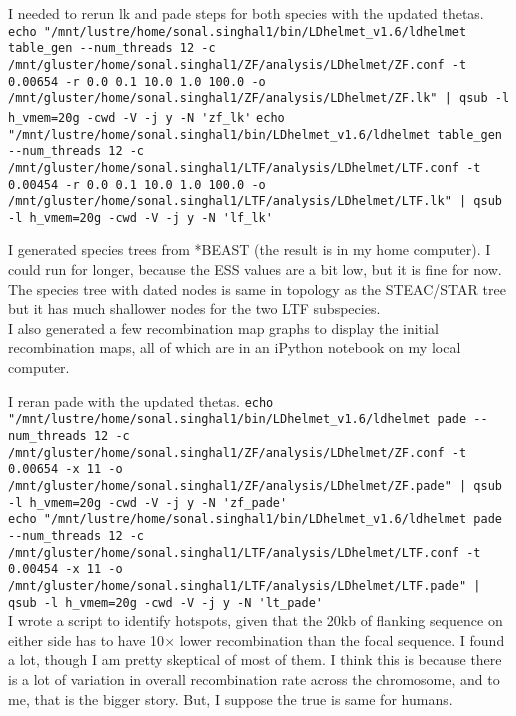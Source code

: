 \documentclass[idxtotoc,hyperref,openany,oneside]{labbook} %
\begin{document}
I needed to rerun lk and pade steps for both species with the updated thetas.
\verb+echo "/mnt/lustre/home/sonal.singhal1/bin/LDhelmet_v1.6/ldhelmet table_gen --num_threads 12 -c /mnt/gluster/home/sonal.singhal1/ZF/analysis/LDhelmet/ZF.conf -t 0.00654 -r 0.0 0.1 10.0 1.0 100.0 -o /mnt/gluster/home/sonal.singhal1/ZF/analysis/LDhelmet/ZF.lk" | qsub -l h_vmem=20g -cwd -V -j y -N 'zf_lk'+
\verb+echo "/mnt/lustre/home/sonal.singhal1/bin/LDhelmet_v1.6/ldhelmet table_gen --num_threads 12 -c /mnt/gluster/home/sonal.singhal1/LTF/analysis/LDhelmet/LTF.conf -t 0.00454 -r 0.0 0.1 10.0 1.0 100.0 -o /mnt/gluster/home/sonal.singhal1/LTF/analysis/LDhelmet/LTF.lk" | qsub -l h_vmem=20g -cwd -V -j y -N 'lf_lk'+

I generated species trees from *BEAST (the result is in my home computer). I could run for longer, because the ESS values are a bit low, but it is fine for now. The species tree with dated nodes is same in topology as the STEAC/STAR tree but it has much shallower nodes for the two LTF subspecies. \\

I also generated a few recombination map graphs to display the initial recombination maps, all of which are in an iPython notebook on my local computer.

I reran pade with the updated thetas.
\verb+echo "/mnt/lustre/home/sonal.singhal1/bin/LDhelmet_v1.6/ldhelmet pade --num_threads 12 -c /mnt/gluster/home/sonal.singhal1/ZF/analysis/LDhelmet/ZF.conf -t 0.00654 -x 11 -o /mnt/gluster/home/sonal.singhal1/ZF/analysis/LDhelmet/ZF.pade" | qsub -l h_vmem=20g -cwd -V -j y -N 'zf_pade'+ \\
\verb+echo "/mnt/lustre/home/sonal.singhal1/bin/LDhelmet_v1.6/ldhelmet pade --num_threads 12 -c /mnt/gluster/home/sonal.singhal1/LTF/analysis/LDhelmet/LTF.conf -t 0.00454 -x 11 -o /mnt/gluster/home/sonal.singhal1/LTF/analysis/LDhelmet/LTF.pade" | qsub -l h_vmem=20g -cwd -V -j y -N 'lt_pade'+
\\

I wrote a script to identify hotspots, given that the 20kb of flanking sequence on either side has to have 10$\times$ lower recombination than the focal sequence. I found a lot, though I am pretty skeptical of most of them. I think this is because there is a lot of variation in overall recombination rate across the chromosome, and to me, that is the bigger story. But, I suppose the true is same for humans. 
\end{document}
